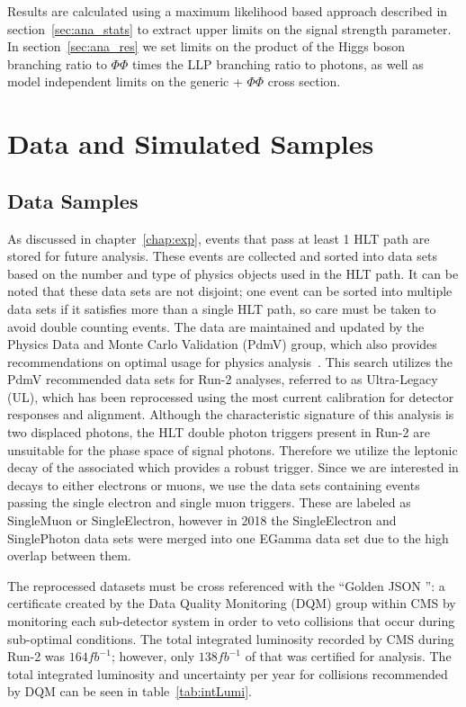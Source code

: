 Results are calculated using a maximum likelihood based approach described in section~\ref{sec:ana_stats} to extract upper limits on the signal strength parameter. In section~\ref{sec:ana_res} we set limits on the product of the Higgs boson branching ratio to $\Phi\Phi$ times the LLP branching ratio to photons, as well as model independent limits on the generic \PZ + $\Phi\Phi$ cross section.

\section{Data and Simulated Samples} \label{sec:ana_samples}

\subsection{Data Samples} \label{sec:ana_data}
As discussed in chapter~\ref{chap:exp}, events that pass at least 1 HLT path are stored for future analysis. These events are collected and sorted into data sets based on the number and type of physics objects used in the HLT path. It can be noted that these data sets are not disjoint; one event can be sorted into multiple data sets if it satisfies more than a single HLT path, so care must be taken to avoid double counting events. The data are maintained and updated by the Physics Data and Monte Carlo Validation (PdmV) group, which also provides recommendations on optimal usage for physics analysis~\cite{pdmv}. This search utilizes the PdmV recommended data sets for Run-2 analyses, referred to as Ultra-Legacy (UL), which has been reprocessed using the most current calibration for detector responses and alignment. Although the characteristic signature of this analysis is two displaced photons, the HLT double photon triggers present in Run-2 are unsuitable for the phase space of signal photons. Therefore we utilize the leptonic decay of the associated \PZ which provides a robust trigger. Since we are interested in \PZ decays to either electrons or muons, we use the data sets containing events passing the single electron and single muon triggers. These are labeled as SingleMuon or SingleElectron, however in 2018 the SingleElectron and SinglePhoton data sets were merged into one EGamma data set due to the high overlap between them.

The reprocessed datasets must be cross referenced with the ``Golden JSON '': a certificate created by the Data Quality Monitoring (DQM) group within CMS by monitoring each sub-detector system in order to veto collisions that occur during sub-optimal conditions. The total integrated luminosity recorded by CMS during Run-2 was $164\unit{fb^{-1}}$; however, only $138\unit{fb^{-1}}$ of that was certified for analysis. The total integrated luminosity and uncertainty per year for collisions recommended by DQM can be seen in table~\ref{tab:intLumi}.

